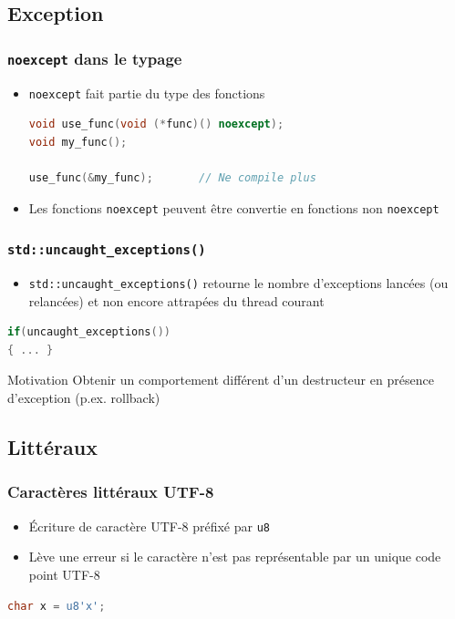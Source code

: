 \documentclass[C++.tex]{subfiles}
\begin{document}
\subsection*{Exception}
\begin{frame}[fragile]
	\frametitle{\lstinline|noexcept| dans le typage}
	\begin{itemize}
		\item \lstinline|noexcept| fait partie du type des fonctions

		\begin{lstlisting}[language=C++]
void use_func(void (*func)() noexcept);
void my_func();

use_func(&my_func);       // Ne compile plus\end{lstlisting}


		\item Les fonctions \lstinline|noexcept| peuvent être convertie en fonctions non \lstinline|noexcept|
	\end{itemize}	

\end{frame}

\begin{frame}[fragile]
	\frametitle{\lstinline|std::uncaught_exceptions()|}
	\begin{itemize}
		\item \lstinline|std::uncaught_exceptions()| retourne le nombre d'exceptions lancées (ou relancées) et non encore attrapées du thread courant
	\end{itemize}

	\begin{lstlisting}[language=C++]
if(uncaught_exceptions())
{ ... }\end{lstlisting}

	\begin{block}{Motivation}
		Obtenir un comportement différent d'un destructeur en présence d'exception (p.ex. rollback)
	\end{block}
\end{frame}

\subsection*{Littéraux}
\begin{frame}[fragile]
	\frametitle{Caractères littéraux UTF-8}
	\begin{itemize}
		\item Écriture de caractère UTF-8 préfixé par \lstinline|u8|
		\item Lève une erreur si le caractère n'est pas représentable par un unique code point UTF-8
	\end{itemize}

	\begin{lstlisting}[language=C++]
char x = u8'x';\end{lstlisting}

\end{frame}
\end{document}
